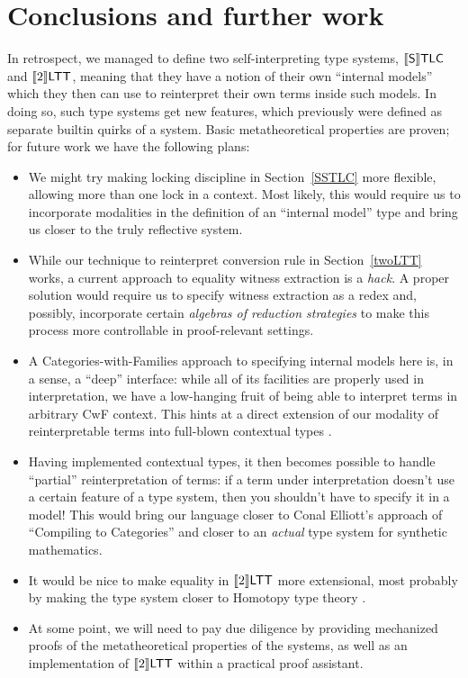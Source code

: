\section{Conclusions and further work}

In retrospect, we managed to define two
self-interpreting type systems, $\llbracket\mathsf{S}\rrbracket\mathsf{TLC}$ and $\llbracket 2\rrbracket\mathsf{LTT}$,
meaning that they have a notion of their own ``internal
models'' which they then can use to reinterpret their
own terms inside such models. In doing so, such type
systems get new features, which previously were defined
as separate builtin quirks of a system. Basic
metatheoretical properties are proven; for future work
we have the following plans:

\begin{itemize}
    \item We might try making locking discipline in
        Section~\ref{SSTLC} more flexible, allowing
        more than one lock in a context. Most likely,
        this would require us to incorporate modalities
        in the definition of an ``internal model'' type
        and bring us closer to the truly reflective
        system.
    \item While our technique to reinterpret conversion
        rule in Section~\ref{twoLTT} works, a current
        approach to equality witness extraction is a
        \textit{hack}. A proper solution would require us
        to specify witness extraction as a redex and,
        possibly, incorporate certain \textit{algebras
        of reduction strategies} to make this process
        more controllable in proof-relevant settings.
    \item A Categories-with-Families approach to
        specifying internal models here is, in a sense,
        a ``deep'' interface: while all of its
        facilities are properly used in interpretation,
        we have a low-hanging fruit of being able to
        interpret terms in arbitrary CwF context. This
        hints at a direct extension of our modality of
        reinterpretable terms into full-blown contextual
        types \cite{Nanevski:2008:CMT}.
    \item Having implemented contextual types, it then
        becomes possible to handle ``partial''
        reinterpretation of terms: if a term under
        interpretation doesn't use a certain feature of
        a type system, then you shouldn't have to
        specify it in a model! This would bring our
        language closer to Conal Elliott's approach of
        ``Compiling to Categories''
        \cite{Elliott:Compcat2017} and closer to
        an \textit{actual} type system for synthetic
        mathematics.
    \item It would be nice to make equality in $\llbracket 2\rrbracket\mathsf{LTT}$
        more extensional, most probably by making the type
        system closer to Homotopy type theory
        \cite{hottbook}.
    \item At some point, we will need to pay due
        diligence by providing mechanized proofs of the
        metatheoretical properties of the systems, as
        well as an
        implementation of $\llbracket 2\rrbracket\mathsf{LTT}$ within a practical
        proof assistant.
\end{itemize}
